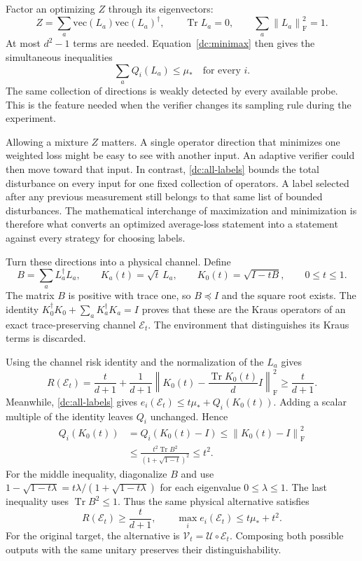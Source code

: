 \documentclass[11pt,a4paper]{article}
\newcommand{\Tr}{\operatorname{Tr}}
\newcommand{\normF}[1]{\left\lVert #1\right\rVert_{\mathrm F}}
\numberwithin{equation}{section}
\begin{document}
Factor an optimizing $Z$ through its eigenvectors:
\[
 Z=\sum_a\mathrm{vec}(L_a)\mathrm{vec}(L_a)^\dagger,
 \qquad \Tr L_a=0,\qquad \sum_a\normF{L_a}^2=1.
\]
At most $d^2-1$ terms are needed.  Equation~\eqref{dc:minimax} then gives
the simultaneous inequalities
\begin{equation}
 \sum_a Q_i(L_a)\leq\mu_*\quad\text{for every }i.
 \label{dc:all-labels}
\end{equation}
The same collection of directions is weakly detected by every available
probe.  This is the feature needed when the verifier changes its sampling
rule during the experiment.

Allowing a mixture $Z$ matters.  A single operator direction that minimizes
one weighted loss might be easy to see with another input.  An adaptive
verifier could then move toward that input.  In contrast,
\eqref{dc:all-labels} bounds the total disturbance on every input for one
fixed collection of operators.  A label selected after any previous
measurement still belongs to that same list of bounded disturbances.  The
mathematical interchange of maximization and minimization is therefore
what converts an optimized average-loss statement into a statement against
every strategy for choosing labels.

Turn these directions into a physical channel.  Define
\[
 B=\sum_aL_a^\dagger L_a,\qquad
 K_a(t)=\sqrt t\,L_a,\qquad
 K_0(t)=\sqrt{I-tB},\qquad 0\leq t\leq1.
\]
The matrix $B$ is positive with trace one, so $B\preceq I$ and the square
root exists.  The identity
$K_0^\dagger K_0+\sum_aK_a^\dagger K_a=I$ proves that these are the
Kraus operators of an exact trace-preserving channel $\mathcal E_t$.
The environment that distinguishes its Kraus terms is discarded.

Using the channel risk identity and the normalization of the $L_a$ gives
\[
 R(\mathcal E_t)=\frac{t}{d+1}
 +\frac1{d+1}\normF{K_0(t)-\frac{\Tr K_0(t)}d I}^{\!2}
 \geq\frac{t}{d+1}.
\]
Meanwhile, \eqref{dc:all-labels} gives
$e_i(\mathcal E_t)\leq t\mu_*+Q_i(K_0(t))$.  Adding a scalar multiple
of the identity leaves $Q_i$ unchanged.  Hence
\begin{align*}
 Q_i(K_0(t))
 &=Q_i(K_0(t)-I)
 \leq\normF{K_0(t)-I}^{\!2}\\
 &\leq\frac{t^2\Tr B^2}{(1+\sqrt{1-t})^2}\leq t^2.
\end{align*}
For the middle inequality, diagonalize $B$ and use
$1-\sqrt{1-t\lambda}=t\lambda/(1+\sqrt{1-t\lambda})$ for each eigenvalue
$0\leq\lambda\leq1$.  The last inequality uses $\Tr B^2\leq1$.
Thus the same physical alternative satisfies
\begin{equation}
 R(\mathcal E_t)\geq\frac{t}{d+1},
 \qquad \max_i e_i(\mathcal E_t)\leq t\mu_*+t^2.
 \label{dc:adversary}
\end{equation}
For the original target, the alternative is
$\mathcal V_t=\mathcal U\circ\mathcal E_t$.  Composing both possible
outputs with the same unitary preserves their distinguishability.
\end{document}
